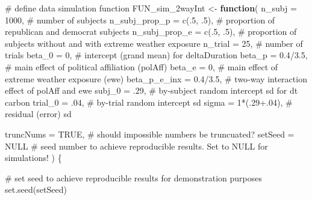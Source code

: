 \documentclass[
  letterpaper,
  DIV=11,
  numbers=noendperiod]{scrartcl}
\newenvironment{Shaded}{\begin{snugshade}}{\end{snugshade}}
\newcommand{\AttributeTok}[1]{\textcolor[rgb]{0.40,0.45,0.13}{#1}}
\newcommand{\CommentTok}[1]{\textcolor[rgb]{0.37,0.37,0.37}{#1}}
\newcommand{\ConstantTok}[1]{\textcolor[rgb]{0.56,0.35,0.01}{#1}}
\newcommand{\ControlFlowTok}[1]{\textcolor[rgb]{0.00,0.23,0.31}{\textbf{#1}}}
\newcommand{\DecValTok}[1]{\textcolor[rgb]{0.68,0.00,0.00}{#1}}
\newcommand{\FloatTok}[1]{\textcolor[rgb]{0.68,0.00,0.00}{#1}}
\newcommand{\FunctionTok}[1]{\textcolor[rgb]{0.28,0.35,0.67}{#1}}
\newcommand{\NormalTok}[1]{\textcolor[rgb]{0.00,0.23,0.31}{#1}}
\newcommand{\OtherTok}[1]{\textcolor[rgb]{0.00,0.23,0.31}{#1}}
\newcommand{\SpecialCharTok}[1]{\textcolor[rgb]{0.37,0.37,0.37}{#1}}
\begin{document}
\begin{Shaded}
\begin{Highlighting}[]
\CommentTok{\# define data simulation function}
\NormalTok{FUN\_sim\_2wayInt }\OtherTok{\textless{}{-}} \ControlFlowTok{function}\NormalTok{(}
  \AttributeTok{n\_subj         =}        \DecValTok{1000}\NormalTok{, }\CommentTok{\# number of subjects}
  \AttributeTok{n\_subj\_prop\_p  =}   \FunctionTok{c}\NormalTok{(.}\DecValTok{5}\NormalTok{, .}\DecValTok{5}\NormalTok{), }\CommentTok{\# proportion of republican and democrat subjects}
  \AttributeTok{n\_subj\_prop\_e  =}   \FunctionTok{c}\NormalTok{(.}\DecValTok{5}\NormalTok{, .}\DecValTok{5}\NormalTok{), }\CommentTok{\# proportion of subjects without and with extreme weather exposure}
  \AttributeTok{n\_trial        =}          \DecValTok{25}\NormalTok{, }\CommentTok{\# number of trials}
  \AttributeTok{beta\_0         =}           \DecValTok{0}\NormalTok{, }\CommentTok{\# intercept (grand mean) for deltaDuration}
  \AttributeTok{beta\_p         =}     \FloatTok{0.4}\SpecialCharTok{/}\FloatTok{3.5}\NormalTok{, }\CommentTok{\# main effect of political affiliation (polAff)}
  \AttributeTok{beta\_e         =}           \DecValTok{0}\NormalTok{, }\CommentTok{\# main effect of extreme weather exposure (ewe)}
  \AttributeTok{beta\_p\_e\_inx   =}     \FloatTok{0.4}\SpecialCharTok{/}\FloatTok{3.5}\NormalTok{, }\CommentTok{\# two{-}way interaction effect of polAff and ewe}
  \AttributeTok{subj\_0         =}\NormalTok{         .}\DecValTok{29}\NormalTok{, }\CommentTok{\# by{-}subject random intercept sd for dt carbon}
  \AttributeTok{trial\_0        =}\NormalTok{         .}\DecValTok{04}\NormalTok{, }\CommentTok{\# by{-}trial random intercept sd}
  \AttributeTok{sigma          =} \DecValTok{1}\SpecialCharTok{*}\NormalTok{(.}\DecValTok{29}\FloatTok{+.04}\NormalTok{), }\CommentTok{\# residual (error) sd}
  
  \AttributeTok{truncNums      =}        \ConstantTok{TRUE}\NormalTok{, }\CommentTok{\# should impossible numbers be truncuated?}
  \AttributeTok{setSeed        =}        \ConstantTok{NULL}  \CommentTok{\# seed number to achieve reproducible results. Set to NULL for simulations!}
\NormalTok{) \{}
  
  \CommentTok{\# set seed to achieve reproducible results for demonstration purposes}
  \FunctionTok{set.seed}\NormalTok{(setSeed)}
  

\end{Highlighting}
\end{Shaded}
\end{document}
